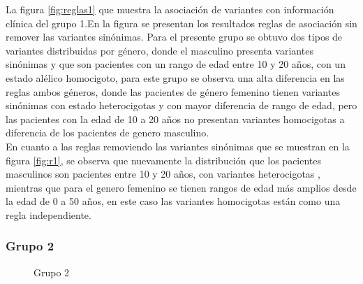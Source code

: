 La figura \ref{fig:reglas1} que muestra la asociación de variantes con información clínica del grupo 1.En la figura \label{fig:re1} se presentan los resultados reglas de asociación sin remover las variantes sinónimas. Para el presente grupo se obtuvo dos tipos de variantes  distribuidas por género, donde el masculino presenta variantes  sinónimas y que son pacientes con un rango de edad entre 10 y 20 años, con un estado alélico homocigoto, para este grupo se observa una alta diferencia en las reglas ambos géneros, donde las pacientes de género femenino tienen variantes sinónimas con estado heterocigotas y con mayor diferencia de rango  de edad, pero las pacientes con la edad de 10 a 20 años no presentan variantes homocigotas a diferencia de los pacientes de genero masculino. \\

En cuanto a las reglas removiendo las variantes sinónimas que se muestran en la figura  \ref{fig:r1}, se observa que  nuevamente la distribución que los pacientes masculinos son pacientes entre 10 y 20 años, con variantes heterocigotas , mientras que para el genero femenino se tienen rangos de edad más amplios desde la edad  de 0 a 50 años, en este caso las variantes homocigotas están como una regla independiente.

\subsubsection*{Grupo 2}

\begin{figure}[H]
	\centering
	\caption{Grupo 2} \label{fig:c2}
\end{figure}

